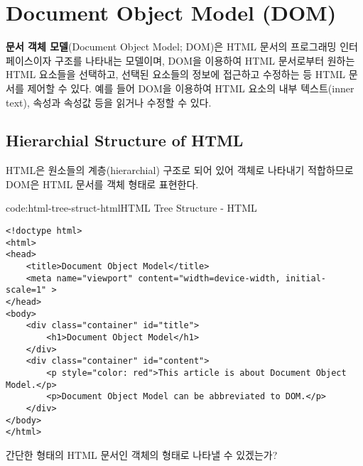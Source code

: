 \section{Document Object Model (DOM)}\label{sect:document-object-model}

\textbf{문서 객체 모델}(Document Object Model; DOM)은 HTML 문서의 프로그래밍 인터페이스이자 구조를 나타내는 모델이며, DOM을 이용하여 HTML 문서로부터 원하는 HTML 요소들을 선택하고, 선택된 요소들의 정보에 접근하고 수정하는 등 HTML 문서를 제어할 수 있다. 예를 들어 DOM을 이용하여 HTML 요소의 내부 텍스트(inner text), 속성과 속성값 등을 읽거나 수정할 수 있다.

\subsection*{Hierarchial Structure of HTML}

HTML은 원소들의 계층(hierarchial) 구조로 되어 있어 객체로 나타내기 적합하므로 DOM은 HTML 문서를 객체 형태로 표현한다.

\begin{codeenv}{code:html-tree-struct-html}{HTML Tree Structure - HTML}\begin{verbatim}
<!doctype html>
<html>
<head>
    <title>Document Object Model</title>
    <meta name="viewport" content="width=device-width, initial-scale=1" >
</head>
<body>
    <div class="container" id="title">
        <h1>Document Object Model</h1>
    </div>
    <div class="container" id="content">
        <p style="color: red">This article is about Document Object Model.</p>
        <p>Document Object Model can be abbreviated to DOM.</p>
    </div>
</body>
</html>
\end{verbatim}
\end{codeenv}

간단한 형태의 HTML 문서인 \을 객체의 형태로 나타낼 수 있겠는가?

